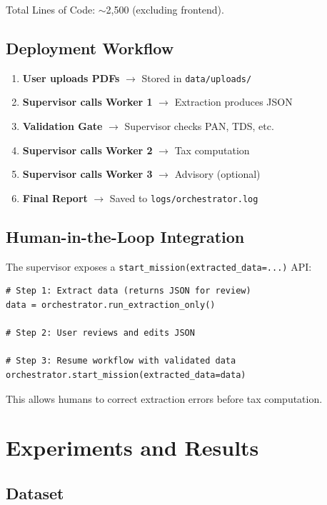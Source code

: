 \documentclass[conference]{IEEEtran}
\begin{document}
Total Lines of Code: $\sim$2,500 (excluding frontend).

\subsection{Deployment Workflow}

\begin{enumerate}
    \item \textbf{User uploads PDFs} $\rightarrow$ Stored in \texttt{data/uploads/}
    \item \textbf{Supervisor calls Worker 1} $\rightarrow$ Extraction produces JSON
    \item \textbf{Validation Gate} $\rightarrow$ Supervisor checks PAN, TDS, etc.
    \item \textbf{Supervisor calls Worker 2} $\rightarrow$ Tax computation
    \item \textbf{Supervisor calls Worker 3} $\rightarrow$ Advisory (optional)
    \item \textbf{Final Report} $\rightarrow$ Saved to \texttt{logs/orchestrator.log}
\end{enumerate}

\subsection{Human-in-the-Loop Integration}

The supervisor exposes a \texttt{start\_mission(extracted\_data=...)} API:

\begin{lstlisting}
# Step 1: Extract data (returns JSON for review)
data = orchestrator.run_extraction_only()

# Step 2: User reviews and edits JSON

# Step 3: Resume workflow with validated data
orchestrator.start_mission(extracted_data=data)
\end{lstlisting}

This allows humans to correct extraction errors before tax computation.

\section{Experiments and Results}
\label{sec:experiments}

\subsection{Dataset}
\end{document}
